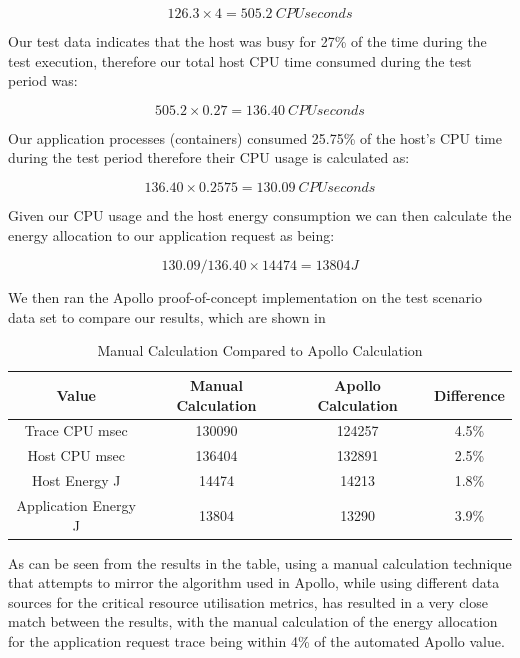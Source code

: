 \begin{equation}
126.3 \times 4 = 505.2 ~CPU seconds
\end{equation}

Our test data indicates that the host was busy for 27\% of the time during the test execution, therefore our total host CPU time consumed during the test period was:

\begin{equation}
505.2 \times 0.27 = 136.40 ~CPU seconds
\end{equation}

Our application processes (containers) consumed 25.75\% of the host's CPU time during the test period therefore their CPU usage is calculated as:

\begin{equation}
136.40 \times 0.2575 = 130.09 ~CPU seconds
\end{equation}

Given our CPU usage and the host energy consumption we can then calculate the energy allocation to our application request as being:

\begin{equation}
130.09 / 136.40 \times 14474 = 13804J
\end{equation}

We then ran the Apollo proof-of-concept implementation on the test scenario data set to compare our results, which are shown in 

\begin{table}
\centering
\caption{Manual Calculation Compared to Apollo Calculation}
\label{table:calculationresults}
\footnotesize
\begin{tabular}{|c|c|c|c|}
\hline
Value & Manual Calculation & Apollo Calculation & Difference \\
\hline
\hline
Trace CPU msec       & 130090 & 124257 & 4.5\% \\
Host CPU msec        & 136404 & 132891 & 2.5\% \\
Host Energy J        & 14474  & 14213  & 1.8\% \\
Application Energy J & 13804  & 13290  & 3.9\% \\
\hline
\end{tabular}
\end{table}

As can be seen from the results in the table, using a manual calculation technique that attempts to mirror the algorithm used in Apollo, while using different data sources for the critical resource utilisation metrics, has resulted in a very close match between the results, with the manual calculation of the energy allocation for the application request trace being within 4\% of the automated Apollo value.

